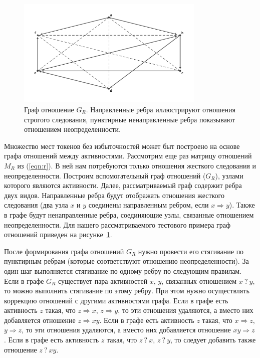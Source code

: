 \documentclass[
11pt,%
tightenlines,%
twoside,%
onecolumn,%
nofloats,%
nobibnotes,%
nofootinbib,%
superscriptaddress,%
noshowpacs,%
centertags]%
{revtex4}
\begin{document}
\begin{figure}[h]
\setcaptionmargin{5mm}
\includegraphics[width=0.8\textwidth]{pics/g_r.pdf}
\caption{Граф отношение $G_R$. Направленные ребра иллюстрируют отношения строгого следования, пунктирные ненаправленные ребра показывают отношением неопределенности.}
\label{fig:g_r}
\end{figure}

Множество мест токенов без избыточностей может быт построено на основе графа отношений между активностями.
Рассмотрим еще раз матрицу отношений $M_R$ из (\ref{eqn:r}).
В ней нам потребуются только отношения жесткого следования и неопределенности.
Построим вспомогательный граф отношений ($G_R$), узлами которого являются активности.
Далее, рассматриваемый граф содержит ребра двух видов.
Направленные ребра будут отображать отношения жесткого следования (два узла $x$ и $y$ соединены направленным ребром, если $x \Rightarrow y$).
Также в графе будут ненаправленные ребра, соединяющие узлы, связанные отношением неопределенности.
Для нашего рассматриваемого тестового примера граф отношений приведен на рисунке~\ref{fig:g_r}.

После формирования графа отношений $G_R$ нужно провести его стягивание по пунктирным ребрам (которые соответствуют отношению неопределенности).
За один шаг выполняется стягивание по одному ребру по следующим правилам.
Если в графе $G_R$ существует пара активностей $x$, $y$, связанных отношением $x \ ? \ y$, то можно выполнить стягивание по этому ребру.
При этом нужно осуществлять коррекцию отношений с другими активностями графа.
Если в графе есть активность $z$ такая, что $z \Rightarrow x$, $z \Rightarrow y$, то эти отношения удаляются, а вместо них добавляется отношение $z \Rightarrow xy$.
Если в графе есть активность $z$ такая, что $x \Rightarrow z$, $y \Rightarrow z$, то эти отношения удаляются, а вместо них добавляется отношение $xy \Rightarrow z$.
Если в графе есть активность $z$ такая, что $z \ ? \ x$, $z \ ? \ y$, то следует добавить также отношение $z \ ? \ xy$.
\end{document}
